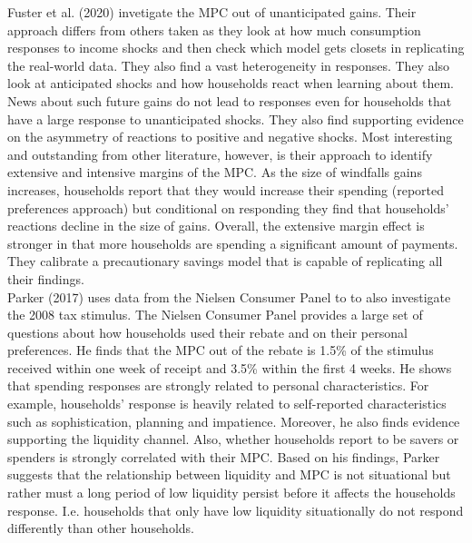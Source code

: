 Fuster et al. (2020) invetigate the MPC out of unanticipated gains. Their approach differs from others taken as they look at how much consumption responses to income shocks and then check which model gets closets in replicating the real-world data. They also find a vast heterogeneity in responses. They also look at anticipated shocks and how households react when learning about them. News about such future gains do not lead to responses even for households that have a large response to unanticipated shocks. They also find supporting evidence on the asymmetry of reactions to positive and negative shocks. Most interesting and outstanding from other literature, however, is their approach to identify extensive and intensive margins of the MPC. As the size of windfalls gains increases, households report that they would increase their spending (reported preferences approach) but conditional on responding they find that households' reactions decline in the size of gains. Overall, the extensive margin effect is stronger in that more households are spending a significant amount of payments. They calibrate a precautionary savings model that is capable of replicating all their findings. \\
Parker (2017) uses data from the Nielsen Consumer Panel to to also investigate the 2008 tax stimulus. The Nielsen Consumer Panel provides a large set of questions about how households used their rebate and on their personal preferences. He finds that the MPC out of the rebate is 1.5\% of the stimulus received within one week of receipt and 3.5\% within the first 4 weeks. He shows that spending responses are strongly related to personal characteristics. For example, households' response is heavily related to self-reported characteristics such as sophistication, planning and impatience. Moreover, he also finds evidence supporting the liquidity channel. Also, whether households report to be savers or spenders is strongly correlated with their MPC. Based on his findings, Parker suggests that the relationship between liquidity and MPC is not situational but rather must a long period of low liquidity persist before it affects the households response. I.e. households that only have low liquidity situationally do not respond differently than other households. \\
